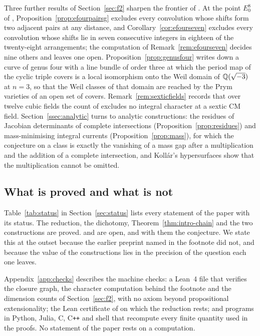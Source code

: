 Three further results of Section~\ref{sec:f2} sharpen the frontier of \Fii{}. At the point $E_{0}^{8}$ of \cite[\S18]{BMB26}, Proposition~\ref{prop:efourpairsg} excludes every convolution whose shifts form two adjacent pairs at any distance, and Corollary~\ref{cor:efourseven} excludes every convolution whose shifts lie in seven consecutive integers in eighteen of the twenty-eight arrangements; the computation of Remark~\ref{rem:efourseven} decides nine others and leaves one open. Proposition~\ref{prop:genusfour} writes down a curve of genus four with a line bundle of order three at which the period map of the cyclic triple covers is a local isomorphism onto the Weil domain of $\mathbb{Q}(\sqrt{-3})$ at $n=3$, so that the Weil classes of that domain are reached by the Prym varieties of an open set of covers. Remark~\ref{rem:sexticfields} records that over twelve cubic fields the count of \cite[Prop.~19.47]{BMB26} excludes no integral character at a sextic CM field. Section~\ref{ssec:analytic} turns to analytic constructions: the residues of Jacobian determinants of complete intersections (Proposition~\ref{prop:residues}) and mass-minimising integral currents (Proposition~\ref{prop:mass}), for which the conjecture on a class is exactly the vanishing of a mass gap after a multiplication and the addition of a complete intersection, and Koll\'ar's hypersurfaces show that the multiplication cannot be omitted.

\subsection{What is proved and what is not}

Table~\ref{tab:status} in Section~\ref{sec:status} lists every statement of the paper with its status. The reduction, the dichotomy, Theorem~\ref{thm:intro-chain} and the two constructions are proved. \Fii{} and \Fiii{} are open, and with them the conjecture. We state this at the outset because the earlier preprint named in the footnote did not, and because the value of the constructions lies in the precision of the question each one leaves.

Appendix~\ref{app:checks} describes the machine checks: a Lean~4 file that verifies the closure graph, the character computation behind the footnote and the dimension counts of Section~\ref{sec:f2}, with no axiom beyond propositional extensionality; the Lean certificate of \cite{BMB26} on which the reduction rests; and programs in Python, Julia, C, C\texttt{++} and shell that recompute every finite quantity used in the proofs. No statement of the paper rests on a computation.
